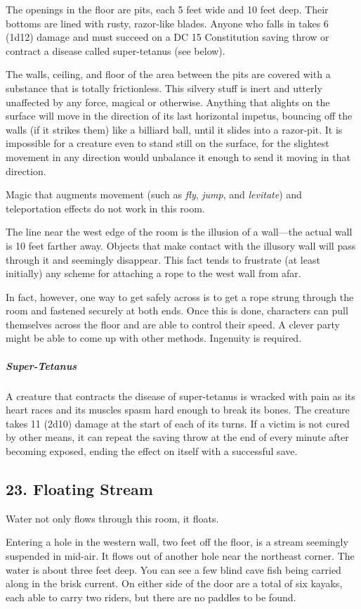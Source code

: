 \documentclass[10pt,a4paper,twoside,bg=print,twocolumn,openany,nodeprecatedcode]{dndbook}
\begin{document}
The openings in the floor are pits, each 5 feet wide and 10 feet deep. Their bottoms are lined with rusty, razor-like blades. Anyone who falls in takes 6 (1d12) damage and must succeed on a DC 15 Constitution saving throw or contract a disease called super-tetanus (see below).

The walls, ceiling, and floor of the area between the pits are covered with a substance that is totally frictionless. This silvery stuff is inert and utterly unaffected by any force, magical or otherwise. Anything that alights on the surface will move in the direction of its last horizontal impetus, bouncing off the walls (if it strikes them) like a billiard ball, until it slides into a razor-pit. It is impossible for a creature even to stand still on the surface, for the slightest movement in any direction would unbalance it enough to send it moving in that direction.

Magic that augments movement (such as \textit{fly}, \textit{jump}, and \textit{levitate}) and teleportation effects do not work in this room.

The line near the west edge of the room is the illusion of a wall—the actual wall is 10 feet farther away. Objects that make contact with the illusory wall will pass through it and seemingly disappear. This fact tends to frustrate (at least initially) any scheme for attaching a rope to the west wall from afar.

In fact, however, one way to get safely across is to get a rope strung through the room and fastened securely at both ends. Once this is done, characters can pull themselves across the floor and are able to control their speed. A clever party might be able to come up with other methods. Ingenuity is required.

\subparagraph{Super-Tetanus}
A creature that contracts the disease of super-tetanus is wracked with pain as its heart races and its muscles spasm hard enough to break its bones. The creature takes 11 (2d10) damage at the start of each of its turns. If a victim is not cured by other means, it can repeat the saving throw at the end of every minute after becoming exposed, ending the effect on itself with a successful save.

\subsection{23. Floating Stream}
\begin{DndReadAloud}{}
Water not only flows through this room, it floats.

Entering a hole in the western wall, two feet off the floor, is a stream seemingly suspended in mid-air. It flows out of another hole near the northeast corner. The water is about three feet deep. You can see a few blind cave fish being carried along in the brisk current. On either side of the door are a total of six kayaks, each able to carry two riders, but there are no paddles to be found.

\end{DndReadAloud}
\end{document}
